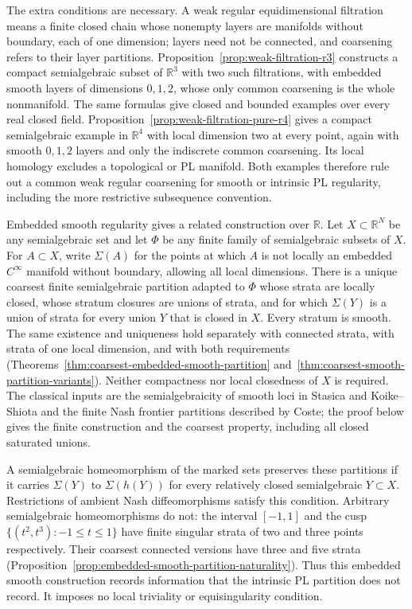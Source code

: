 \documentclass[11pt,a4paper]{article}
\theoremstyle{definition}
\begin{document}
The extra conditions are necessary. A weak regular equidimensional
filtration means a finite closed chain whose nonempty layers are
manifolds without boundary, each of one dimension; layers need not
be connected, and coarsening refers to their layer partitions.
Proposition~\ref{prop:weak-filtration-r3} constructs a compact
semialgebraic subset of $\mathbb R^3$ with two such filtrations,
with embedded smooth layers of dimensions $0,1,2$, whose only
common coarsening is the whole nonmanifold. The same formulas
give closed and bounded examples over every real closed field.
Proposition~\ref{prop:weak-filtration-pure-r4} gives a compact
semialgebraic example in $\mathbb R^4$ with local dimension two
at every point, again with smooth $0,1,2$ layers and only the
indiscrete common coarsening. Its local homology excludes a
topological or PL manifold. Both examples therefore rule out
a common weak regular coarsening for smooth or intrinsic PL
regularity, including the more restrictive subsequence convention.

Embedded smooth regularity gives a related construction over
$\mathbb R$. Let $X\subset\mathbb R^N$ be any semialgebraic set
and let $\Phi$ be any finite family of semialgebraic subsets of $X$.
For $A\subset X$, write $\Sigma(A)$ for the points at which $A$
is not locally an embedded $C^\infty$ manifold without boundary,
allowing all local dimensions. There is a unique coarsest finite
semialgebraic partition adapted to $\Phi$ whose strata are locally
closed, whose stratum closures are unions of strata, and for which
$\Sigma(Y)$ is a union of strata for every union $Y$ that is closed
in $X$. Every stratum is smooth. The same existence and uniqueness
hold separately with connected strata, with strata of one local
dimension, and with both requirements
(Theorems~\ref{thm:coarsest-embedded-smooth-partition}
and~\ref{thm:coarsest-smooth-partition-variants}).
Neither compactness nor local closedness of $X$ is required.
The classical inputs are the semialgebraicity of smooth loci in
Stasica and Koike--Shiota and the finite Nash frontier partitions
described by Coste; the proof below gives the finite construction
and the coarsest property, including all closed saturated unions.

A semialgebraic homeomorphism of the marked sets preserves these
partitions if it carries $\Sigma(Y)$ to $\Sigma(h(Y))$ for every
relatively closed semialgebraic $Y\subset X$. Restrictions of
ambient Nash diffeomorphisms satisfy this condition. Arbitrary
semialgebraic homeomorphisms do not: the interval $[-1,1]$ and
the cusp $\{(t^2,t^3):-1\le t\le1\}$ have finite singular
strata of two and three points respectively. Their coarsest
connected versions have three and five strata
(Proposition~\ref{prop:embedded-smooth-partition-naturality}).
Thus this embedded smooth construction records information that
the intrinsic PL partition does not record. It imposes no local
triviality or equisingularity condition.
\end{document}
